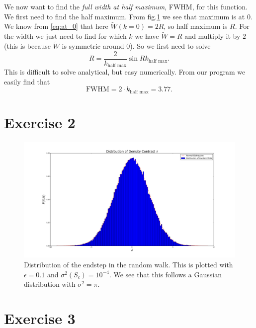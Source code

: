 \documentclass[a4paper,norsk, 10pt]{article}
\begin{document}
We now want to find the \textit{full width at half maximum}, FWHM, for this function. We first need to find the half maximum. From fig.\ref{fig:fourier} we see that maximum is at $0$. We know from \eqref{eq:at_0} that here $\tilde{W}(k=0) = 2R$, so half maximum is $R$. For the width we just need to find for which $k$ we have $\tilde{W} = R$ and multiply it by $2$ (this is because $\tilde{W}$ is symmetric around $0$). So we first need to solve
\begin{equation}
R = \frac{2}{k_{\text{half max}}}\sin Rk_{\text{half max}}.
\end{equation}
This is difficult to solve analytical, but easy numerically. From our program we easily find that 
\begin{equation}
\text{FWHM} = 2\cdot k_{\text{half max}} = 3.77.
\end{equation}

\section{Exercise 2}

\begin{figure}[H]
\centering
\includegraphics[scale=0.3]{dist}
\caption{Distribution of the endstep in the random walk. This is plotted with $\epsilon = 0.1$ and $\sigma^2(S_c) = 10^{-4}$. We see that this follows a Gaussian distribution with $\sigma^2 = \pi$.}\label{fig:fourier}
\end{figure}


\section{Exercise 3}
\end{document}
